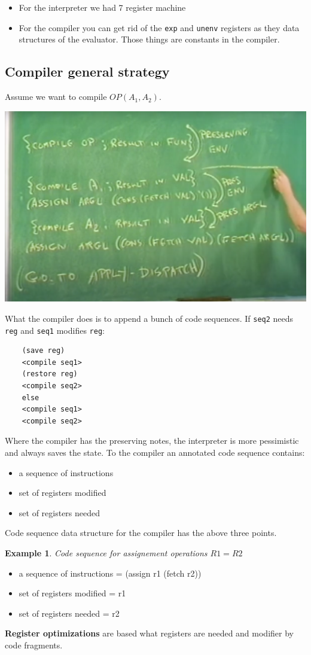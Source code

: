 \documentclass[a4paper,twoside]{article}
\newtheorem{example}[theorem]{Example}
\numberwithin{equation}{section}
\begin{document}
\begin{itemize}
    \item For the interpreter we had 7 register machine
    \item For the compiler you can get rid of the \texttt{exp} and \texttt{unenv} registers as they
    data structures of the evaluator. Those things are constants in the compiler.
\end{itemize}

\subsection{Compiler general strategy}
Assume we want to compile $OP(A_1,A_2)$.
\begin{center}
    \includegraphics[scale = 0.2]{assets/append_seq_compiler.png}
\end{center}
What the compiler does is to append a bunch of code sequences. If \texttt{seq2} needs \texttt{reg} and \texttt{seq1}
modifies \texttt{reg}:
\begin{lstlisting}
    (save reg)
    <compile seq1>
    (restore reg)
    <compile seq2>
    else
    <compile seq1>
    <compile seq2>
\end{lstlisting}
Where the compiler has the preserving notes, the interpreter is more pessimistic and always saves the state.
To the compiler an annotated code sequence contains:
\begin{itemize}
    \item a sequence of instructions
    \item set of registers modified
    \item set of registers needed
\end{itemize}
Code sequence data structure for the compiler has the above three points.
\begin{example}
    Code sequence for assignement operations $R1 = R2$
\end{example}
\begin{itemize}
    \item a sequence of instructions = (assign r1 (fetch r2))
    \item set of registers modified = {r1}
    \item set of registers needed = {r2}
\end{itemize}
\textbf{Register optimizations} are based what registers are needed and modifier by code fragments.
\end{document}
